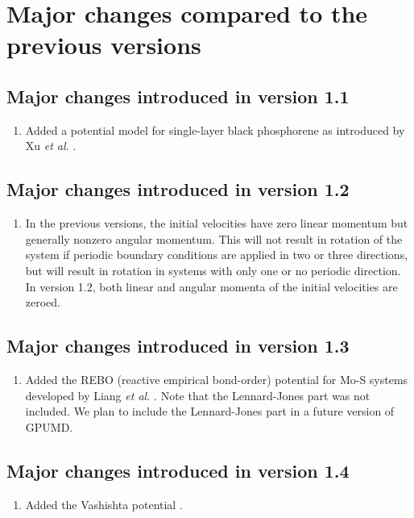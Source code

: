 \documentclass[12pt,a4paper]{report}
\begin{document}
\section{Major changes compared to the previous versions}

\subsection{Major changes introduced in version 1.1}
\begin{enumerate}
\item Added a potential model for single-layer black phosphorene as introduced by Xu \textit{et al.} \cite{xu2015jap}.
\end{enumerate}

\subsection{Major changes introduced in version 1.2}
\begin{enumerate}
\item In the previous versions, the initial velocities have zero linear momentum but generally nonzero angular momentum. This will not result in rotation of the system if periodic boundary conditions are applied in two or three directions, but will result in rotation in systems with only one or no periodic direction. In version 1.2, both linear and angular momenta of the initial velocities are zeroed.
\end{enumerate}

\subsection{Major changes introduced in version 1.3}
\begin{enumerate}
\item Added the REBO (reactive empirical bond-order) potential for Mo-S systems developed by Liang \textit{et al.} \cite{liang2009prb,liang2012prb_erratum}. Note that the Lennard-Jones part was not included. We plan to include the Lennard-Jones part in a future version of GPUMD. 
\end{enumerate}


\subsection{Major changes introduced in version 1.4}
\begin{enumerate}
\item Added the Vashishta potential \cite{vashishta2007jap}.
\end{enumerate}
\end{document}
